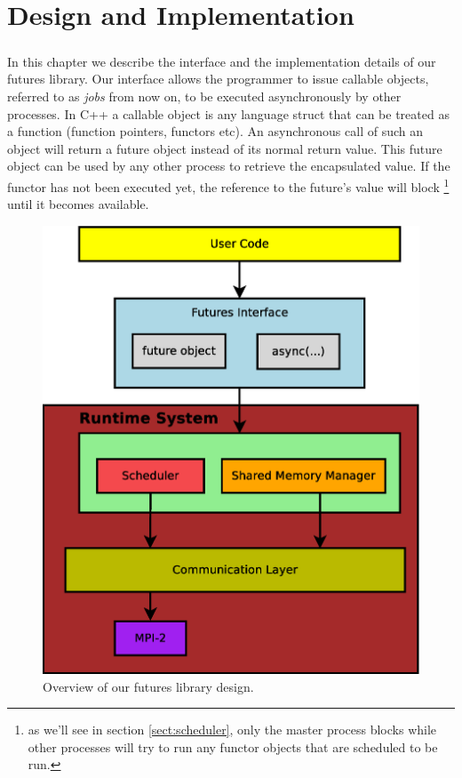 \chapter{Design and Implementation}
\label{chap:implementation}

\paragraph{}
	In this chapter we describe the interface and the implementation details of our futures library.
Our interface allows the programmer to issue callable objects, referred to as \emph{jobs} from now on,
to be executed asynchronously by other processes.  In C++ a callable object is any language struct that
can be treated as a function (function pointers, functors etc). 
An asynchronous call of such an object will return a future object instead of its normal 
return value.  This future object can be used by any other process to retrieve the encapsulated value.  If
the functor has not been executed yet, the reference to the future's value will block \footnote{
as we'll see in section \ref{sect:scheduler}, only the master process blocks while other processes will try to 
run any functor objects that are scheduled to be run.}
until it becomes available.  

\begin{figure}[!ht]
\center
\includegraphics[width=0.5\columnwidth]{figures/system_overview}
\caption{Overview of our futures library design.}
\label{fig:system_overview}
\end{figure} 

